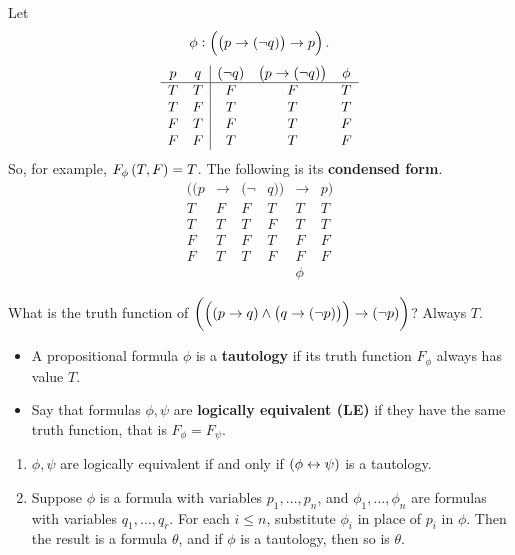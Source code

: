 \begin{example*}
Let
$$ \phi : \impb{\impb{p}{\notb{q}}}{p}. $$
$$
\begin{array}{cc|ccc}
p & q & \notb{q} & \impb{p}{\notb{q}} & \phi \\
\hline
T & T & F & F & T \\
T & F & T & T & T \\
F & T & F & T & F \\
F & F & T & T & F
\end{array}
$$
So, for example, $ F_\phi\br{T, F} = T $. The following is its \textbf{condensed form}.
$$
\begin{array}{rcrlcl}
((p & \rightarrow & (\neg & q)) & \rightarrow & p) \\
\hline
T & F & F & T & T & T \\
T & T & T & F & T & T \\
F & T & F & T & F & F \\
F & T & T & F & F & F \\
& & & & \phi &
\end{array}
$$
\end{example*}


\begin{example*}
What is the truth function of $ \impb{\andb{\impb{p}{q}}{\impb{q}{\notb{p}}}}{\notb{p}} $? Always $ T $.
\end{example*}

\begin{definition}
\hfill
\begin{itemize}
\item A propositional formula $ \phi $ is a \textbf{tautology} if its truth function $ F_\phi $ always has value $ T $.
\item Say that formulas $ \phi, \psi $ are \textbf{logically equivalent (LE)} if they have the same truth function, that is $ F_\phi = F_\psi $.
\end{itemize}
\end{definition}

\begin{remark}
\label{rem:1.1.5}
\hfill
\begin{enumerate}
\item $ \phi, \psi $ are logically equivalent if and only if $ \iffb{\phi}{\psi} $ is a tautology.
\item Suppose $ \phi $ is a formula with variables $ p_1, \dots, p_n $, and $ \phi_1, \dots, \phi_n $ are formulas with variables $ q_1, \dots, q_r $. For each $ i \le n $, substitute $ \phi_i $ in place of $ p_i $ in $ \phi $. Then the result is a formula $ \theta $, and if $ \phi $ is a tautology, then so is $ \theta $.
\end{enumerate}
\end{remark}

